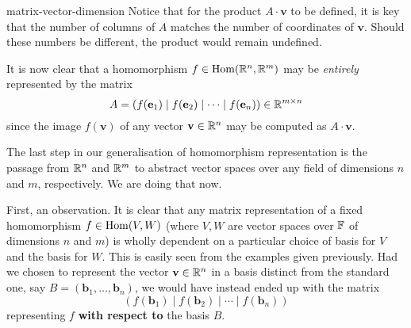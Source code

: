 \begin{warning}{}{matrix-vector-dimension}
 Notice that for the product $A \cdot \mathbf{v}$ to be defined, it is key that
 the number of columns of $A$ matches the number of coordinates of $\mathbf{v}$.
 Should these numbers be different, the product would remain undefined.
\end{warning}

It is now clear that a homomorphism $f \in \operatorname{Hom}(\mathbb{R}^{n},\mathbb{R}^{m})$ may be
\emph{entirely} represented by the matrix
\[
 A = (f(\mathbf{e}_1) \mid f(\mathbf{e}_2) \mid \cdots \mid f(\mathbf{e}_n)) \in
 \mathbb{R}^{m \times n}
\]
since the image $f(\mathbf{v})$ of any vector $\mathbf{v} \in \mathbb{R}^{n}$ may be
computed as $A \cdot \mathbf{v}$.

The last step in our generalisation of homomorphism representation is the
passage from $\mathbb{R}^{n}$ and $\mathbb{R}^{m}$ to abstract vector spaces over any field of
dimensions $n$ and $m$, respectively. We are doing that now.

First, an observation. It is clear that any matrix representation of a fixed
homomorphism $f \in \operatorname{Hom}(V,W)$ (where $V,W$ are vector spaces over $\mathbb{F}$ of
dimensions $n$ and $m$) is wholly dependent on a particular choice of basis for
$V$ and the basis for $W$. This is easily seen from the examples given
previously. Had we chosen to represent the vector $\mathbf{v} \in \mathbb{R}^{n}$ in
a basis distinct from the standard one, say $B =
(\mathbf{b}_1,\ldots,\mathbf{b}_n)$, we would have instead ended up with the
matrix
\[
 (f(\mathbf{b}_1) \mid f(\mathbf{b}_2) \mid \cdots \mid f(\mathbf{b}_n))
\]
representing $f$ \textbf{with respect to} the basis $B$.

